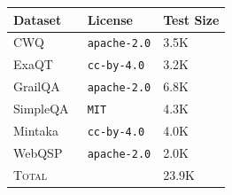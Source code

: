 \documentclass[11pt]{article}
\begin{document}
\begin{table}[t]
    \centering
        \centering
        \scriptsize
            \begin{tabular}{lll}
            \toprule
            \textbf{Dataset} & \textbf{License} & \textbf{Test Size} \\%
            \midrule
            CWQ~\citep{talmor-berant-2018-web} 
              & \texttt{apache-2.0}
              & 3.5K\\
            ExaQT~\citep{10.1145/3459637.3482416} 
              & \texttt{cc-by-4.0}
              & 3.2K \\
            GrailQA~\citep{10.1145/3442381.3449992} 
              & \texttt{apache-2.0}
              & 6.8K \\
            SimpleQA~\citep{wei2024measuring} 
              & \texttt{MIT}
              & 4.3K \\
            Mintaka~\citep{sen-etal-2022-mintaka} 
              & \texttt{cc-by-4.0} 
              & 4.0K \\
            WebQSP~\citep{yih-etal-2016-value} 
              & \texttt{apache-2.0}
              & 2.0K \\
              \midrule
              \textsc{Total}& & 23.9K \\
            \bottomrule
            \end{tabular}%
        \label{tab:qa-datasets}
\end{table}
\end{document}
